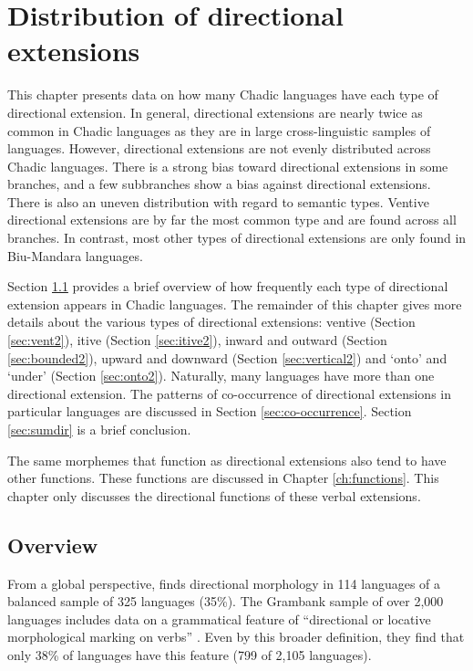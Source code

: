 \chapter{Distribution of directional extensions} \label{ch:distribution}

This chapter presents data on how many Chadic languages have each type of directional extension. In general, directional extensions are nearly twice as common in Chadic languages as they are in large cross-linguistic samples of languages. However, directional extensions are not evenly distributed across Chadic languages. There is a strong bias toward directional extensions in some branches, and a few subbranches show a bias against directional extensions. There is also an uneven distribution with regard to semantic types. Ventive directional extensions are by far the most common type and are found across all branches. In contrast, most other types of directional extensions are only found in Biu-Mandara languages. 

Section \ref{sec:diroverview} provides a brief overview of how frequently each type of directional extension appears in Chadic languages. The remainder of this chapter gives more details about the various types of directional extensions: ventive (Section \ref{sec:vent2}), itive (Section \ref{sec:itive2}), inward and outward (Section \ref{sec:bounded2}), upward and downward (Section \ref{sec:vertical2}) and `onto' and `under' (Section \ref{sec:onto2}). Naturally, many languages have more than one directional extension. The patterns of co-occurrence of directional extensions in particular languages are discussed in Section \ref{sec:co-occurrence}. Section \ref{sec:sumdir} is a brief conclusion.

The same morphemes that function as directional extensions also tend to have other functions. These functions are discussed in Chapter \ref{ch:functions}. This chapter only discusses the directional functions of these verbal extensions. 

\section{Overview} \label{sec:diroverview}

From a global perspective, \citet[277--283]{rossPseudocoordinationSerialVerb2021} finds directional morphology in 114 languages of a balanced sample of 325 languages (35\%). The Grambank sample of over 2,000 languages includes data on a grammatical feature of ``directional or locative morphological marking on verbs'' \citep{thegrambankconsortiumGrambankV12023}. Even by this broader definition, they find that only 38\% of languages have this feature (799 of 2,105 languages).

